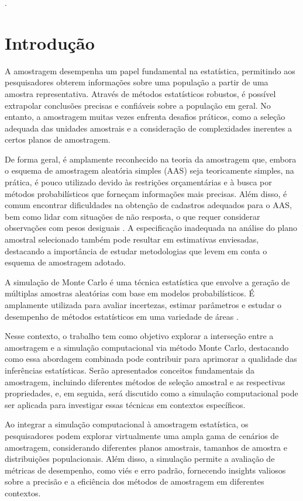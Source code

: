 \documentclass[sn-basic,pdflatex]{sn-jnl}
\theoremstyle{remark}
\theoremstyle{definition}
\begin{document}
\newpage

.

\hypertarget{introduuxe7uxe3o}{%
\section{Introdução}\label{introduuxe7uxe3o}}

A amostragem desempenha um papel fundamental na estatística, permitindo
aos pesquisadores obterem informações sobre uma população a partir de
uma amostra representativa. Através de métodos estatísticos robustos, é
possível extrapolar conclusões precisas e confiáveis sobre a população
em geral. No entanto, a amostragem muitas vezes enfrenta desafios
práticos, como a seleção adequada das unidades amostrais e a
consideração de complexidades inerentes a certos planos de amostragem.

De forma geral, é amplamente reconhecido na teoria da amostragem que,
embora o esquema de amostragem aleatória simples (AAS) seja teoricamente
simples, na prática, é pouco utilizado devido às restrições
orçamentárias e à busca por métodos probabilísticos que forneçam
informações mais precisas. Além disso, é comum encontrar dificuldades na
obtenção de cadastros adequados para o AAS, bem como lidar com situações
de não resposta, o que requer considerar observações com pesos desiguais
\citep{skinner2005design}. A especificação inadequada na análise do
plano amostral selecionado também pode resultar em estimativas
enviesadas, destacando a importância de estudar metodologias que levem
em conta o esquema de amostragem adotado.

A simulação de Monte Carlo é uma técnica estatística que envolve a
geração de múltiplas amostras aleatórias com base em modelos
probabilísticos. É amplamente utilizada para avaliar incertezas, estimar
parâmetros e estudar o desempenho de métodos estatísticos em uma
variedade de áreas \citep{kroese2012monte}.

Nesse contexto, o trabalho tem como objetivo explorar a interseção entre
a amostragem e a simulação computacional via método Monte Carlo,
destacando como essa abordagem combinada pode contribuir para aprimorar
a qualidade das inferências estatísticas. Serão apresentados conceitos
fundamentais da amostragem, incluindo diferentes métodos de seleção
amostral e as respectivas propriedades, e, em seguida, será discutido
como a simulação computacional pode ser aplicada para investigar essas
técnicas em contextos específicos.

Ao integrar a simulação computacional à amostragem estatística, os
pesquisadores podem explorar virtualmente uma ampla gama de cenários de
amostragem, considerando diferentes planos amostrais, tamanhos de
amostra e distribuições populacionais. Além disso, a simulação permite a
avaliação de métricas de desempenho, como viés e erro padrão, fornecendo
insights valiosos sobre a precisão e a eficiência dos métodos de
amostragem em diferentes contextos.
\end{document}

